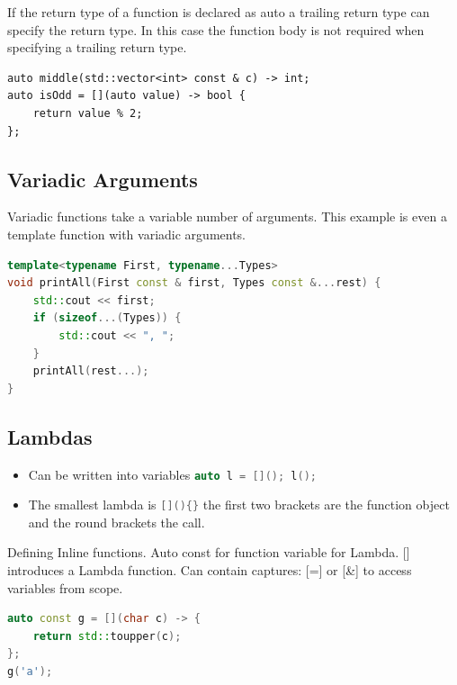  If the return type of a function is declared as auto a trailing return type can specify the return type. In this case the function body is not required when specifying a trailing return type.
 
 \begin{lstlisting}
auto middle(std::vector<int> const & c) -> int;
auto isOdd = [](auto value) -> bool {
	return value % 2; 
};
\end{lstlisting}

\subsection{Variadic Arguments}
Variadic functions take a variable number of arguments. This example is even a template function with variadic arguments.
\begin{lstlisting}[language=C++]
template<typename First, typename...Types> 
void printAll(First const & first, Types const &...rest) {
	std::cout << first;
	if (sizeof...(Types)) {
		std::cout << ", "; 
	} 
	printAll(rest...);
}
\end{lstlisting}


\subsection{Lambdas}
\begin{itemize}
  \itemsep -0.5em 
  \item Can be written into variables \lstinline[language=C++]|auto l = [](); l();|
  \item The smallest lambda is \lstinline[language=C++]|[](){}| the first two brackets are the function object and the round brackets the call.
\end{itemize}

Defining Inline functions. Auto const for function variable for Lambda. [] introduces a Lambda function. Can contain captures: [=] or [\&] to access variables from scope.
\begin{lstlisting}[language=C++]
auto const g = [](char c) -> {
	return std::toupper(c);
};
g('a');
\end{lstlisting}

